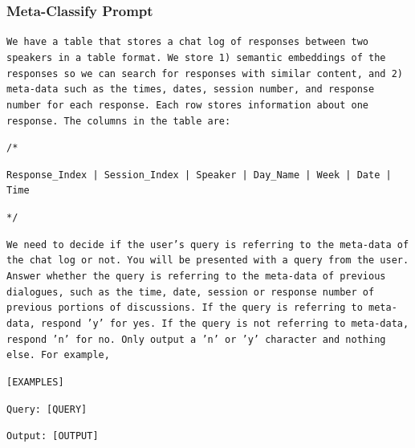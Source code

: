 \documentclass{article}
\begin{document}
\subsubsection{Meta-Classify Prompt}
\colorbox{prompt_gray}{\begin{minipage}{.98\textwidth}
\texttt{We have a table that stores a chat log of responses between two speakers in a table format. We store 1) semantic embeddings of the responses so we can search for responses with similar content, and 2) meta-data such as  the times, dates, session number, and response number for each response. Each row stores information about one response. The columns in the table are:}
\newline

\texttt{/*}

\texttt{Response\_Index | Session\_Index | Speaker | Day\_Name | Week | Date | Time}

\texttt{*/}
\newline

\texttt{We need to decide if the user's query is referring to the meta-data of the chat log or not. You will be presented with a query from the user. Answer whether the query is referring to the meta-data of previous dialogues, such as the time, date, session or response number of previous portions of discussions. If the query is referring to meta-data, respond 'y' for yes. If the query is not referring to meta-data, respond 'n' for no. Only output a 'n' or 'y' character and nothing else. For example,}
\newline

\texttt{[EXAMPLES]}
\newline

\texttt{Query: [QUERY]}

\texttt{Output: [OUTPUT]}
\end{minipage}}


\newpage
\end{document}
